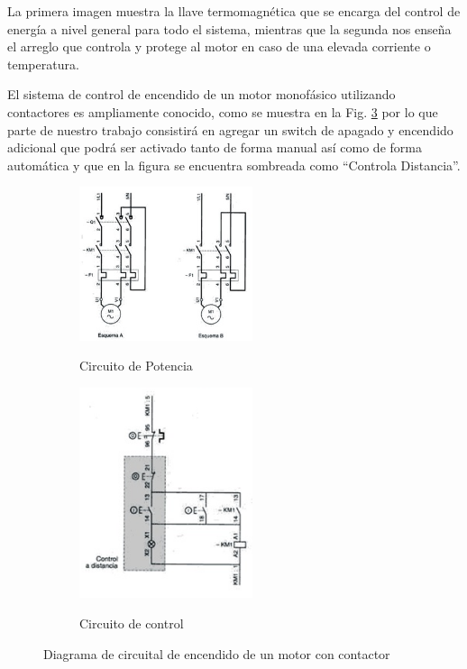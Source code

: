 \documentclass[main_conf.tex]{subfiles}
\begin{document}
La primera imagen muestra la llave termomagnética que se encarga del
control de energía a nivel general para todo el sistema, mientras que la 
segunda nos enseña el arreglo que controla y protege al motor en caso de 
una elevada corriente o temperatura.

El sistema de control de encendido de un motor monofásico utilizando
contactores es ampliamente conocido, como se muestra en la Fig. 
\ref{diag_control_on_off_motor} por lo que parte de nuestro trabajo 
consistirá en agregar un switch de apagado y encendido adicional que podrá 
ser activado tanto de forma manual así como de forma automática y que en
la figura se encuentra sombreada como “Controla Distancia”.

\begin{figure}[t]
  \centering
  \begin{subfigure}[b]{0.5\textwidth}
    \centering
    \includegraphics[width=2.0in]{../img/caja_electrica/Circuito_de_potencia.png}
    \label{Circuito_de_potencia}
    \caption{Circuito de Potencia}
  \end{subfigure}
     
  \begin{subfigure}[b]{0.5\textwidth}
    \centering
    \includegraphics[width=2.0in]{../img/caja_electrica/Circuito_de_control.png}
    \label{Circuito_de_control}
    \caption{Circuito de control}
  \end{subfigure}

  \caption{Diagrama de circuital de encendido de un motor con contactor}
  \label{diag_control_on_off_motor}
\end{figure}
\end{document}
